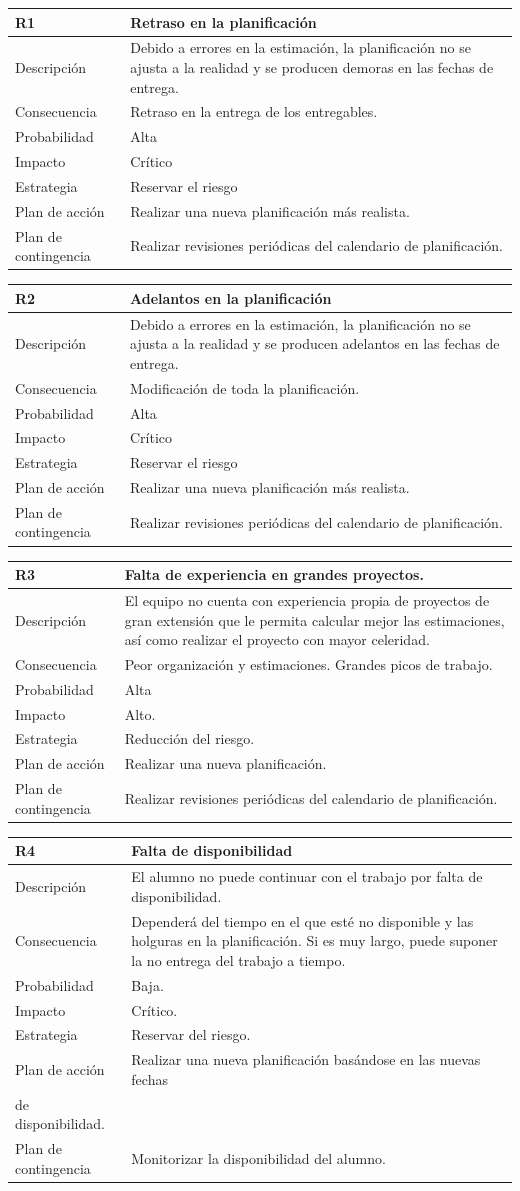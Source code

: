 \documentclass[twoside]{report}
\newcommand\addrow[2]{#1 &#2\\ }
\newcommand\addheading[2]{#1 &#2\\ \hline}
\newcommand\tabularhead{\begin{tabular}{lp{0.7\textwidth}}
\hline
}
\newenvironment{risk}{\tabularhead}
{\hline\end{tabular}}
\begin{document}
\begin{risk}
  \addheading{R1}{Retraso en la planificación}
  \addrow{Descripción}{Debido a errores en la estimación, la planificación no se ajusta a la realidad y se producen demoras en las fechas de entrega.}
  \addrow{Consecuencia}{Retraso en la entrega de los entregables.}
  \addrow{Probabilidad}{Alta }
  \addrow{Impacto}{Crítico}
  \addrow{Estrategia}{Reservar el riesgo}
  \addrow{Plan de acción}{Realizar una nueva planificación más realista. }
  \addrow{Plan de contingencia}{Realizar revisiones periódicas del calendario de planificación.}
\end{risk}

\begin{risk}
  \addheading{R2}{Adelantos en la planificación}
  \addrow{Descripción}{Debido a errores en la estimación, la planificación no se ajusta a la realidad y se producen adelantos en las fechas de entrega.}
  \addrow{Consecuencia}{Modificación de toda la planificación.}
  \addrow{Probabilidad}{Alta }
  \addrow{Impacto}{Crítico}
  \addrow{Estrategia}{Reservar el riesgo}
  \addrow{Plan de acción}{Realizar una nueva planificación más realista. }
  \addrow{Plan de contingencia}{Realizar revisiones periódicas del calendario de planificación.}
\end{risk}

\begin{risk}
  \addheading{R3}{Falta de experiencia en grandes proyectos.}
  \addrow{Descripción}{El equipo no cuenta con experiencia propia de proyectos de gran extensión que le permita calcular mejor las estimaciones, así como realizar el proyecto con mayor celeridad.}
  \addrow{Consecuencia}{Peor organización y estimaciones. Grandes picos de trabajo.}
  \addrow{Probabilidad}{Alta }
  \addrow{Impacto}{Alto. }
  \addrow{Estrategia}{Reducción del riesgo.}
  \addrow{Plan de acción}{Realizar una nueva planificación. }
  \addrow{Plan de contingencia}{Realizar revisiones periódicas del calendario de planificación.}
\end{risk}

\begin{risk}
  \addheading{R4}{Falta de disponibilidad}
  \addrow{Descripción}{El alumno no puede continuar con el trabajo por falta de disponibilidad.}
  \addrow{Consecuencia}{Dependerá del tiempo en el que esté no disponible y las holguras en la planificación. Si es muy largo, puede suponer la no entrega del trabajo a tiempo.}
  \addrow{Probabilidad}{Baja.}
  \addrow{Impacto}{Crítico. }
  \addrow{Estrategia}{Reservar del riesgo.}
  \addrow{Plan de acción}{Realizar una nueva planificación basándose en las nuevas fechas \\de disponibilidad.}
  \addrow{Plan de contingencia}{Monitorizar la disponibilidad del alumno.}
\end{risk}
\end{document}
